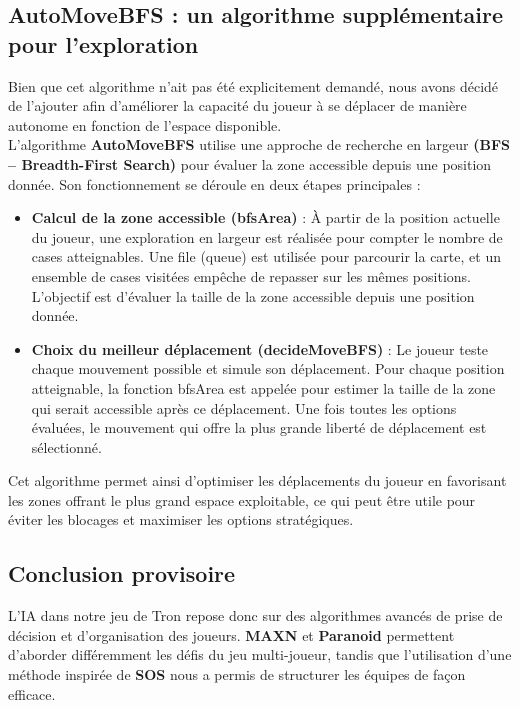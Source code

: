 \subsection{AutoMoveBFS : un algorithme supplémentaire pour l'exploration}
Bien que cet algorithme n'ait pas été explicitement demandé, nous avons décidé de l'ajouter afin d'améliorer la capacité du joueur à se déplacer de manière autonome en fonction de l’espace disponible. \\
L'algorithme \textbf{AutoMoveBFS} utilise une approche de recherche en largeur \textbf{(BFS – Breadth-First Search)} pour évaluer la zone accessible depuis une position donnée. Son fonctionnement se déroule en deux étapes principales :
\begin{itemize}
    \item \textbf{Calcul de la zone accessible (bfsArea)} : À partir de la position actuelle du joueur, une exploration en largeur est réalisée pour compter le nombre de cases atteignables. Une file (queue) est utilisée pour parcourir la carte, et un ensemble de cases visitées empêche de repasser sur les mêmes positions. L’objectif est d’évaluer la taille de la zone accessible depuis une position donnée.
    \item \textbf{Choix du meilleur déplacement (decideMoveBFS)} : Le joueur teste chaque mouvement possible et simule son déplacement. Pour chaque position atteignable, la fonction bfsArea est appelée pour estimer la taille de la zone qui serait accessible après ce déplacement. Une fois toutes les options évaluées, le mouvement qui offre la plus grande liberté de déplacement est sélectionné.
\end{itemize}
Cet algorithme permet ainsi d’optimiser les déplacements du joueur en favorisant les zones offrant le plus grand espace exploitable, ce qui peut être utile pour éviter les blocages et maximiser les options stratégiques.

\subsection{Conclusion provisoire}
L'IA dans notre jeu de Tron repose donc sur des algorithmes avancés de prise de décision et d'organisation des joueurs. \textbf{MAXN} et \textbf{Paranoid} permettent d'aborder différemment les défis du jeu multi-joueur, tandis que l'utilisation d'une méthode inspirée de \textbf{SOS} nous a permis de structurer les équipes de façon efficace.
